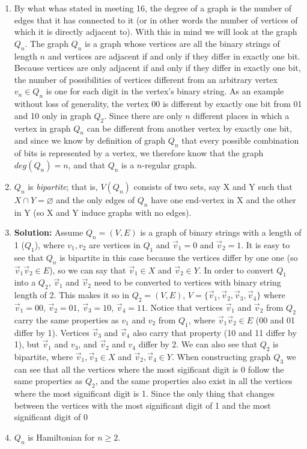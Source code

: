 \documentclass[10pt,a4paper]{report}
\begin{document}
\begin{enumerate}
			\item[] By what whas stated in meeting 16, the degree of a graph is the number of edges that it has connected to it (or in other words the number of vertices of which it is directly adjacent to).  With this in mind we will look at the graph $Q_{n}$.  The graph $Q_{n}$ is a graph whose vertices are all the binary strings of length $n$ and vertices are adjacent if and only if they differ in exactly one bit.  Because vertices are only adjacent if and only if they differ in exactly one bit, the number of possibilities of vertices different from an arbitrary vertex $v_{n}\in Q_{n}$ is one for each digit in the vertex's binary string.  As an example without loss of generality, the vertex 00 is different by exactly one bit from 01 and 10 only in graph $Q_{2}$.  Since there are only $n$ different places in which a vertex in graph $Q_{n}$ can be different from another vertex by exactly one bit, and since we know by definition of graph $Q_{n}$ that every possible combination of bits is represented by a vertex, we therefore know that the graph $deg(Q_{n})=n$, and that $Q_{n}$ is a $n$-regular graph.
			
			\item $Q_n$ is \textit{bipartite}; that is, $V(Q_n)$ consists of two sets, say X and Y such that $X\cap Y = \varnothing$ and the only edges of $Q_n$ have one end-vertex in X and the other in Y (so X and Y induce graphs with no edges).
			
			\item[]\textbf{Solution: }Assume $Q_{n}=(V, E)$ is a graph of binary strings with a length of 1 ($Q_{1}$), where $v_{1}, v_{2}$ are vertices in $Q_{1}$ and $\vec{v}_{1} = 0$ and $\vec{v}_{2} = 1$.  It is easy to see that $Q_{n}$ is bipartite in this case because the vertices differ by one one (so $\vec{v}_{1}\vec{v}_{2}\in E$), so we can say that  $\vec{v}_{1}\in X$ and $\vec{v}_{2}\in Y$.  In order to convert $Q_{1}$ into a $Q_{2}$, $\vec{v}_{1}$ and $\vec{v}_{2}$ need to be converted to vertices with binary string length of 2.  This makes it so in $Q_{2}=(V, E)$, $V = \{\vec{v}_{1}, \vec{v}_{2}, \vec{v}_{3}, \vec{v}_{4}\}$ where $\vec{v}_{1}=00$, $\vec{v}_{2}=01$, $\vec{v}_{3}=10$, $\vec{v}_{4}=11$.  Notice that vertices $\vec{v}_{1}$ and $\vec{v}_{2}$ from $Q_{2}$ carry the same properties as $v_{1}$ and $v_{2}$ from $Q_{1}$, where $\vec{v}_{1}\vec{v}_{2}\in E$ (00 and 01 differ by 1).  Vertices $\vec{v}_{3}$ and $\vec{v}_{4}$ also carry that property (10 and 11 differ by 1), but $\vec{v}_{1}$ and $v_{3}$, and $\vec{v}_{2}$ and $v_{4}$ differ by 2.  We can also see that $Q_{2}$ is bipartite, where $\vec{v}_{1}, \vec{v}_{3}\in X$ and $\vec{v}_{2}, \vec{v}_{4}\in Y$.  When constructing graph $Q_{3}$ we can see that all the vertices where the most sigificant digit is 0 follow the same properties as $Q_{2}$, and the same properties also exist in all the vertices where the most significant digit is 1.  Since the only thing that changes between the vertices with the most significant digit of 1 and the most significant digit of 0
			
			\item $Q_n$ is Hamiltonian for $n \geq 2$.
		\end{enumerate}
		
\end{document}
